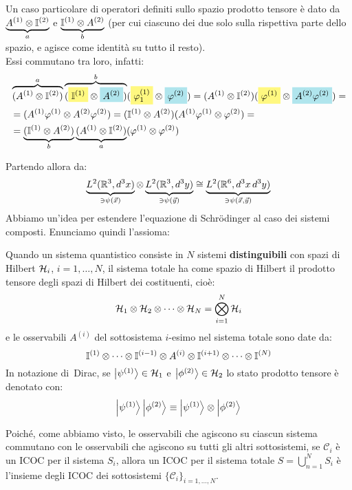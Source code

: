 \documentclass[../../FisicaTeorica.tex]{subfiles}
\begin{document}
Un caso particolare di operatori definiti sullo spazio prodotto tensore è dato da $\underbrace{A^{(1)}\otimes \mathbb{I}^{(2)}}_{a}$ e $\underbrace{\mathbb{I}^{(1)}\otimes A^{(2)}}_{b}$ (per cui ciascuno dei due  solo sulla rispettiva parte dello spazio, e agisce come identità su tutto il resto).\\
Essi commutano tra loro, infatti:
\begin{align*}
&\overbrace{(A^{(1)}\otimes \bb{I}^{(2)})}^{a}\overbrace{(\hlc{Yellow}{\bb{I}^{(1)}}\otimes \hlc{SkyBlue}{A^{(2)}})}^{b}(\hlc{Yellow}{\varphi_1^{(1)}}\otimes \hlc{SkyBlue}{\varphi^{(2)}})=(A^{(1)}\otimes \bb{I}^{(2)})(\hlc{Yellow}{\varphi^{(1)}}\otimes \hlc{SkyBlue}{A^{(2)}\varphi^{(2)}})=\\
&=(A^{(1)}\varphi^{(1)}\otimes A^{(2)}\varphi^{(2)})=(\bb{I}^{(1)}\otimes A^{(2)})(A^{(1)}\varphi^{(1)}\otimes \varphi^{(2)})=\\
&=\underbrace{(\bb{I}^{(1)}\otimes A^{(2)})}_{b}\underbrace{(A^{(1)}\otimes \bb{I}^{(2)})}_{a}(\varphi^{(1)}\otimes \varphi^{(2)})
\end{align*}

Partendo allora da:
\[
\underbrace{L^2(\mathbb{R}^3, d^3x)}_{\ni \psi(\vec{x})} \otimes\underbrace{ L^2(\mathbb{R}^3, d^3 y) }_{\ni\psi(\vec{y})}\cong \underbrace{L^2(\mathbb{R}^6, d^3x\,d^3y)}_{\ni \psi(\vec{x},\vec{y})}
\]
Abbiamo un'idea per estendere l'equazione di Schr\"odinger al caso dei sistemi composti. Enunciamo quindi l'assioma:
\begin{axi}
Quando un sistema quantistico consiste in $N$ sistemi \textbf{distinguibili} con spazi di Hilbert $\mathcal{H}_i$, $i=1,\dots, N$, il sistema totale ha come spazio di Hilbert il prodotto tensore degli spazi di Hilbert dei costituenti, cioè:
\[
\mathcal{H}_1 \otimes \mathcal{H}_2 \otimes \cdots \otimes \mathcal{H}_N = \bigotimes_{i=1}^N \mathcal{H}_i
\]
e le osservabili $A^{(i)}$ del sottosistema $i$-esimo nel sistema totale sono date da:
\[
\mathbb{I}^{(1)}\otimes \cdots \otimes \mathbb{I}^{(i-1)}\otimes A^{(i)}\otimes \mathbb{I}^{(i+1)}\otimes \cdots \otimes \mathbb{I}^{(N)}
\]
In notazione di\ Dirac, se $\Ket{\psi^{(1)}}\in \mathcal{H}_1$ e $\Ket{\phi^{(2)}}\in \mathcal{H}_2$ lo stato prodotto tensore è denotato  con:
\[
\Ket{\psi^{(1)}}\Ket{\phi^{(2)}} \equiv \Ket{\psi^{(1)}}\otimes \Ket{\phi^{(2)}}
\]
\end{axi}
Poiché, come abbiamo visto, le osservabili che agiscono su ciascun sistema commutano con le osservabili che agiscono su tutti gli altri sottosistemi, se $\mathcal{C}_i$ è un ICOC per il sistema $S_i$, allora un ICOC per il sistema totale $S=\bigcup_{n=1}^N S_i$ è l'insieme degli ICOC dei sottosistemi $\{\mathcal{C}_i\}_{i=1,\dots,N}$.\\
\end{document}
